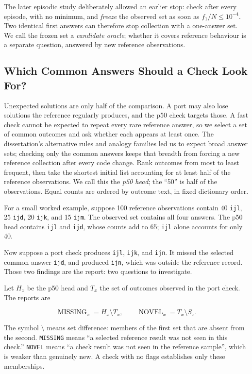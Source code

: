 \documentclass[10pt,letterpaper]{article}
\begin{document}
The later episodic study deliberately allowed an earlier stop: check after every episode,
with no minimum, and \emph{freeze} the observed set as soon as \(f_1/N\le10^{-4}\). Two
identical first answers can therefore stop collection with a one-answer set. We call the
frozen set a \emph{candidate oracle}; whether it covers reference behaviour is a separate
question, answered by new reference observations.

\subsection{Which Common Answers Should a Check Look For?}\label{sec:flags}

Unexpected solutions are only half of the comparison. A port may also lose solutions the
reference regularly produces, and the p50 check targets those. A fast check cannot be
expected to repeat every rare reference answer, so we select a set of common outcomes and
ask whether each appears at least once. The dissertation's alternative rules and analogy
families \citep[Chapters 3 and 5]{ref21} led us to expect broad answer sets; checking only
the common answers keeps that breadth from forcing a new reference collection after every
code change. Rank outcomes from most to least frequent, then take the shortest initial
list accounting for at least half of the reference observations. We call this the
\emph{p50 head}; the ``50'' is half of the observations. Equal counts are ordered by
outcome text, in fixed dictionary order.

For a small worked example, suppose 100 reference observations contain 40 \texttt{ijl}, 25
\texttt{ijd}, 20 \texttt{ijk}, and 15 \texttt{ijm}. The observed set contains all four
answers. The p50 head contains \texttt{ijl} and \texttt{ijd}, whose counts add to 65;
\texttt{ijl} alone accounts for only 40.

Now suppose a port check produces \texttt{ijl}, \texttt{ijk}, and \texttt{ijn}. It missed
the selected common answer \texttt{ijd}, and produced \texttt{ijn}, which was outside the
reference record. Those two findings are the report: two questions to investigate.

Let \(H_x\) be the p50 head and \(T_x\) the set of outcomes observed in the port check.
The reports are

\[
\operatorname{MISSING}_x=H_x\setminus T_x,\qquad
\operatorname{NOVEL}_x=T_x\setminus S_x.
\]

The symbol \(\setminus\) means set difference: members of the first set that are absent
from the second. \texttt{MISSING} means ``a selected reference result was not seen in this
check.'' \texttt{NOVEL} means ``a check result was not seen in the reference sample'',
which is weaker than genuinely new. A check with no flags establishes only these
memberships.
\end{document}

